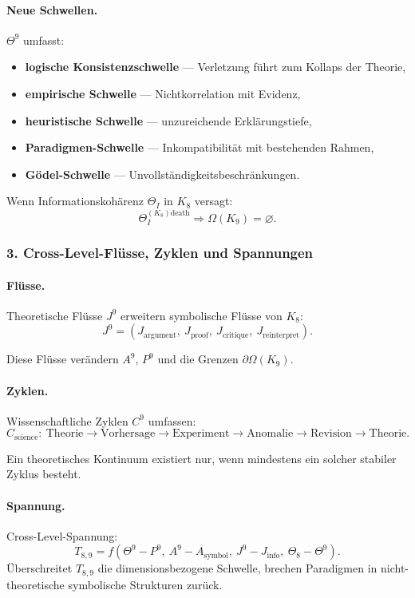 \paragraph{Neue Schwellen.}
$\Theta^9$ umfasst:
\begin{itemize}
  \item \textbf{logische Konsistenzschwelle} — Verletzung führt zum Kollaps der Theorie,
  \item \textbf{empirische Schwelle} — Nichtkorrelation mit Evidenz,
  \item \textbf{heuristische Schwelle} — unzureichende Erklärungstiefe,
  \item \textbf{Paradigmen-Schwelle} — Inkompatibilität mit bestehenden Rahmen,
  \item \textbf{Gödel-Schwelle} — Unvollständigkeitsbeschränkungen.
\end{itemize}

Wenn Informationskohärenz $\Theta_I$ in $K_8$ versagt:
\[
\Theta_I^{(K_8)\mathrm{death}} \Rightarrow \Omega(K_9)=\varnothing.
\]

\subsubsection{3. Cross-Level-Flüsse, Zyklen und Spannungen}

\paragraph{Flüsse.}
Theoretische Flüsse $J^9$ erweitern symbolische Flüsse von $K_8$:
\[
J^9 = (J_{\mathrm{argument}},\ J_{\mathrm{proof}},\
       J_{\mathrm{critique}},\ J_{\mathrm{reinterpret}}).
\]

Diese Flüsse verändern $A^9$, $P^9$ und die Grenzen $\partial\Omega(K_9)$.

\paragraph{Zyklen.}
Wissenschaftliche Zyklen $C^9$ umfassen:
\[
C_{\mathrm{science}}:\
\text{Theorie} \rightarrow \text{Vorhersage} \rightarrow \text{Experiment}
\rightarrow \text{Anomalie} \rightarrow \text{Revision} \rightarrow \text{Theorie}.
\]

Ein theoretisches Kontinuum existiert nur, wenn mindestens ein solcher stabiler
Zyklus besteht.

\paragraph{Spannung.}
Cross-Level-Spannung:
\[
T_{8,9} =
f(\Theta^9 - P^9,\ A^9 - A_{\mathrm{symbol}},\
  J^9 - J_{\mathrm{info}},\ \Theta_8 - \Theta^9).
\]
Überschreitet $T_{8,9}$ die dimensionsbezogene Schwelle, brechen Paradigmen in
nicht-theoretische symbolische Strukturen zurück.

